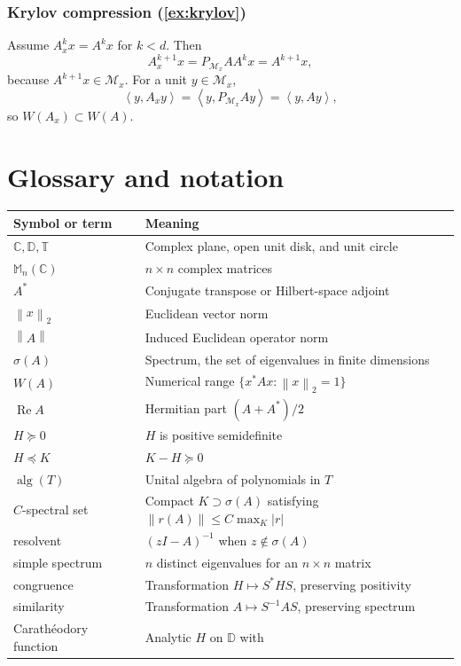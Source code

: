 \documentclass[11pt,oneside,openany]{book}
\theoremstyle{definition}
\theoremstyle{remark}
\newcommand{\C}{\mathbb C}
\newcommand{\D}{\mathbb D}
\newcommand{\Torus}{\mathbb T}
\newcommand{\Mn}{\mathbb M_n(\C)}
\newcommand{\alg}{\operatorname{alg}}
\newcommand{\RePart}{\operatorname{Re}}
\newcommand{\spec}{\sigma}
\newcommand{\ip}[2]{\left\langle #1,#2\right\rangle}
\newcommand{\norm}[1]{\left\lVert #1\right\rVert}
\begin{document}
\subsection*{Krylov compression (\cref{ex:krylov})}

Assume \(A_x^kx=A^kx\) for \(k<d\).  Then
\[
  A_x^{k+1}x
  =P_{\mathcal M_x}AA^kx
  =A^{k+1}x,
\]
because \(A^{k+1}x\in\mathcal M_x\).  For a unit
\(y\in\mathcal M_x\),
\[
  \ip{y}{A_xy}
  =\ip{y}{P_{\mathcal M_x}Ay}
  =\ip{y}{Ay},
\]
so \(W(A_x)\subset W(A)\).

\chapter{Glossary and notation}
\label{app:glossary}

\begin{longtable}{@{}L{0.23\textwidth}L{0.68\textwidth}@{}}
\toprule
\textbf{Symbol or term}&\textbf{Meaning}\\
\midrule
\endhead
\(\C,\D,\Torus\)&Complex plane, open unit disk, and unit circle\\
\(\Mn\)&\(n\times n\) complex matrices\\
\(A^*\)&Conjugate transpose or Hilbert-space adjoint\\
\(\norm{x}_2\)&Euclidean vector norm\\
\(\norm{A}\)&Induced Euclidean operator norm\\
\(\spec(A)\)&Spectrum, the set of eigenvalues in finite dimensions\\
\(W(A)\)&Numerical range
\(\{x^*Ax:\norm{x}_2=1\}\)\\
\(\RePart A\)&Hermitian part \((A+A^*)/2\)\\
\(H\succeq0\)&\(H\) is positive semidefinite\\
\(H\preceq K\)&\(K-H\succeq0\)\\
\(\alg(T)\)&Unital algebra of polynomials in \(T\)\\
\(C\)-spectral set&Compact \(K\supset\spec(A)\) satisfying
\(\norm{r(A)}\leq C\max_K|r|\)\\
resolvent&\((zI-A)^{-1}\) when \(z\notin\spec(A)\)\\
simple spectrum&\(n\) distinct eigenvalues for an \(n\times n\) matrix\\
congruence&Transformation \(H\mapsto S^*HS\), preserving positivity\\
similarity&Transformation \(A\mapsto S^{-1}AS\), preserving spectrum\\
Carath\'eodory function&Analytic \(H\) on \(\D\) with

\end{longtable}
\end{document}

